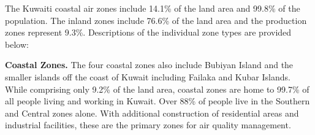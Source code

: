 \begin{sidewaystable}  %
\begin{table}[H]
\centering
\caption{Air Quality Zone Statistics.}
\label{tb:aqzstats}
\end{table}
\end{sidewaystable}

The Kuwaiti coastal air zones include 14.1\% of the land area and 99.8\% of the population.  The inland zones include 76.6\% of the land area and the production zones represent 9.3\%.  Descriptions of the individual zone types are provided below:

\textbf{Coastal Zones.} The four coastal zones also include Bubiyan Island and the smaller islands off the coast of Kuwait including Failaka and Kubar Islands.  While comprising only 9.2\% of the land area, coastal zones are home to 99.7\% of all people living and working in Kuwait. Over 88\% of people live in the Southern and Central zones alone.  With additional construction of residential areas and industrial facilities, these are the primary zones for air quality management. 

